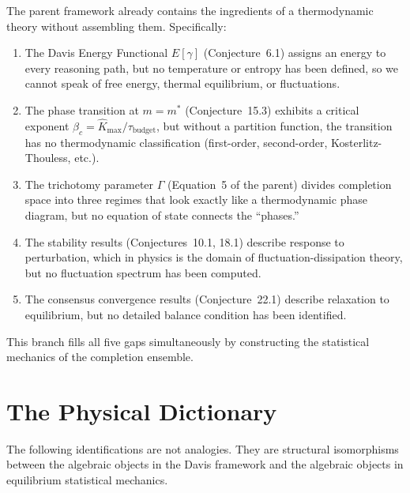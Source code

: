 \documentclass[11pt,letterpaper]{article}
\newcommand{\Khat}{\hat{K}}
\newcommand{\tbudget}{\tau_{\mathrm{budget}}}
\begin{document}
The parent framework already contains the ingredients of a thermodynamic 
theory without assembling them. Specifically:

\begin{enumerate}[label=(\roman*)]
    \item The Davis Energy Functional $E[\gamma]$ (Conjecture~6.1) assigns 
    an energy to every reasoning path, but no temperature or entropy has 
    been defined, so we cannot speak of free energy, thermal equilibrium, 
    or fluctuations.
    
    \item The phase transition at $m = m^*$ (Conjecture~15.3) exhibits 
    a critical exponent $\beta_c = \Khat_{\max}/\tbudget$, but without a 
    partition function, the transition has no thermodynamic classification 
    (first-order, second-order, Kosterlitz-Thouless, etc.).
    
    \item The trichotomy parameter $\Gamma$ (Equation~5 of the parent) 
    divides completion space into three regimes that look exactly like a 
    thermodynamic phase diagram, but no equation of state connects the 
    ``phases.''
    
    \item The stability results (Conjectures~10.1, 18.1) describe response 
    to perturbation, which in physics is the domain of 
    fluctuation-dissipation theory, but no fluctuation spectrum has been 
    computed.
    
    \item The consensus convergence results (Conjecture~22.1) describe 
    relaxation to equilibrium, but no detailed balance condition has been 
    identified.
\end{enumerate}

This branch fills all five gaps simultaneously by constructing the 
statistical mechanics of the completion ensemble.

\section{The Physical Dictionary}

The following identifications are not analogies. They are structural 
isomorphisms between the algebraic objects in the Davis framework and the 
algebraic objects in equilibrium statistical mechanics.
\end{document}
